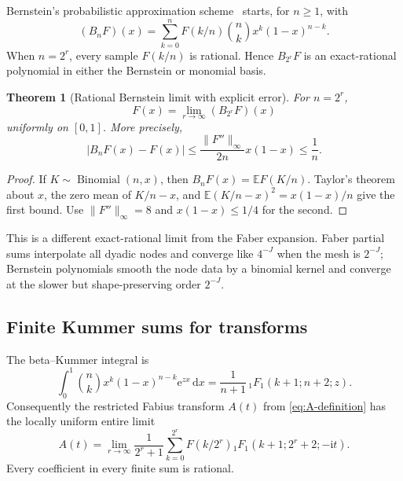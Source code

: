 \documentclass[11pt,oneside]{article}
\newtheorem{theorem}{Theorem}[section]
\theoremstyle{definition}
\theoremstyle{remark}
\newcommand{\E}{\mathbb E}
\newcommand{\dd}{\,\mathrm d}
\newcommand{\ii}{\mathrm i}
\newcommand{\e}{\mathrm e}
\newcommand{\1}{\mathbf 1}
\begin{document}
Bernstein's probabilistic approximation scheme~\cite{bernstein1912} starts, for $n\ge1$, with
\begin{equation}
 (B_nF)(x)=\sum_{k=0}^{n}F(k/n)\binom nkx^k(1-x)^{n-k}.  \label{eq:bernstein-F}
\end{equation}
When $n=2^r$, every sample $F(k/n)$ is rational.  Hence $B_{2^r}F$ is an
exact-rational polynomial in either the Bernstein or monomial basis.

\begin{theorem}[Rational Bernstein limit with explicit error]
\label{thm:bernstein-F}
For $n=2^r$,
\begin{equation}
 \boxed{\displaystyle
 F(x)=\lim_{r\to\infty}(B_{2^r}F)(x)}                   \label{eq:bernstein-limit}
\end{equation}
uniformly on $[0,1]$.  More precisely,
\begin{equation}
 |B_nF(x)-F(x)|
 \le\frac{\|F''\|_\infty}{2n}x(1-x)
 \le\frac1n.                                            \label{eq:bernstein-error}
\end{equation}
\end{theorem}

\begin{proof}
If $K\sim\operatorname{Binomial}(n,x)$, then
$B_nF(x)=\E F(K/n)$.  Taylor's theorem about $x$, the zero mean of
$K/n-x$, and
$\E(K/n-x)^2=x(1-x)/n$ give the first bound.  Use
$\|F''\|_\infty=8$ and $x(1-x)\le1/4$ for the second.
\end{proof}

This is a different exact-rational limit from the Faber expansion.  Faber
partial sums interpolate all dyadic nodes and converge like $4^{-J}$ when
the mesh is $2^{-J}$; Bernstein polynomials smooth the node data by a binomial
kernel and converge at the slower but shape-preserving order $2^{-J}$.

\subsection{Finite Kummer sums for transforms}

The beta--Kummer integral is
\begin{equation}
 \int_0^1\binom nkx^k(1-x)^{n-k}\e^{zx}\dd x
 =\frac1{n+1}\,{}_1F_1(k+1;n+2;z).                      \label{eq:beta-kummer}
\end{equation}
Consequently the restricted Fabius transform
$A(t)$ from \eqref{eq:A-definition} has the locally uniform entire limit
\begin{equation}
 \boxed{\displaystyle
 A(t)=\lim_{r\to\infty}\frac1{2^r+1}
 \sum_{k=0}^{2^r}F(k/2^r)
 {}_1F_1(k+1;2^r+2;-\ii t).}                            \label{eq:F-bernstein-kummer}
\end{equation}
Every coefficient in every finite sum is rational.
\end{document}
